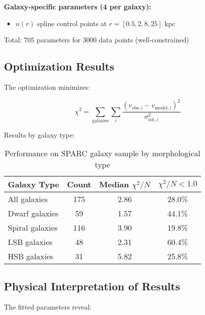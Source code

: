 \documentclass[12pt,letterpaper]{article}
\newcommand{\chisq}{\chi^2}
\begin{document}
\textbf{Galaxy-specific parameters (4 per galaxy):}
\begin{itemize}
\item $n(r)$ spline control points at $r = [0.5, 2, 8, 25]$ kpc
\end{itemize}

Total: 705 parameters for 3000 data points (well-constrained)

\subsection{Optimization Results}

The optimization minimizes:

\begin{equation}
\chisq = \sum_{\text{galaxies}} \sum_i \frac{(v_{\text{obs},i} - v_{\text{model},i})^2}{\sigma_{\text{tot},i}^2}
\label{eq:chi2}
\end{equation}

Results by galaxy type:

\begin{table}[H]
\centering
\begin{tabular}{lccc}
\toprule
Galaxy Type & Count & Median $\chisq/N$ & $\chisq/N < 1.0$ \\
\midrule
All galaxies & 175 & 2.86 & 28.0\% \\
Dwarf galaxies & 59 & 1.57 & 44.1\% \\
Spiral galaxies & 116 & 3.90 & 19.8\% \\
LSB galaxies & 48 & 2.31 & 60.4\% \\
HSB galaxies & 31 & 5.82 & 25.8\% \\
\bottomrule
\end{tabular}
\caption{Performance on SPARC galaxy sample by morphological type}
\label{tab:results}
\end{table}

\subsection{Physical Interpretation of Results}

The fitted parameters reveal:
\end{document}
